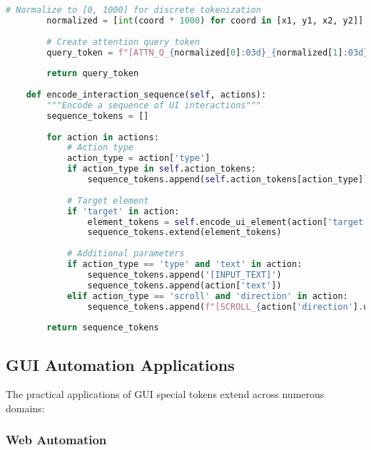 \begin{lstlisting}[language=Python, caption=ScreenAI-style interface understanding]
        # Normalize to [0, 1000] for discrete tokenization
        normalized = [int(coord * 1000) for coord in [x1, y1, x2, y2]]
        
        # Create attention query token
        query_token = f"[ATTN_Q_{normalized[0]:03d}_{normalized[1]:03d}_{normalized[2]:03d}_{normalized[3]:03d}]"
        
        return query_token
    
    def encode_interaction_sequence(self, actions):
        """Encode a sequence of UI interactions"""
        sequence_tokens = []
        
        for action in actions:
            # Action type
            action_type = action['type']
            if action_type in self.action_tokens:
                sequence_tokens.append(self.action_tokens[action_type])
            
            # Target element
            if 'target' in action:
                element_tokens = self.encode_ui_element(action['target'])
                sequence_tokens.extend(element_tokens)
            
            # Additional parameters
            if action_type == 'type' and 'text' in action:
                sequence_tokens.append('[INPUT_TEXT]')
                sequence_tokens.append(action['text'])
            elif action_type == 'scroll' and 'direction' in action:
                sequence_tokens.append(f"[SCROLL_{action['direction'].upper()}]")
        
        return sequence_tokens
\end{lstlisting}

\subsection{GUI Automation Applications}

The practical applications of GUI special tokens extend across numerous domains:

\subsubsection{Web Automation}


